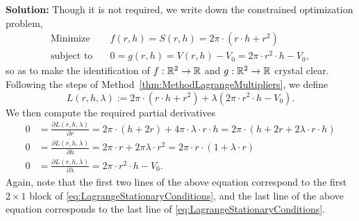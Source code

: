 \textbf{Solution:} Though it is not required, we write down the constrained optimization problem,
\begin{align*}
\text{Minimize} \quad & f(r,h)=S(r,h) = 2 \pi \cdot (r \cdot h + r^2)\\
\text{subject to} \quad & 0 = g(r,h) = V(r,h)-V_0 = 2 \pi \cdot r^2 \cdot h - V_0,
\end{align*}
so as to make the identification of $f:\mathbb R^2 \to \mathbb R$ and $g:\mathbb R^2 \to \mathbb R$ crystal clear. Following the steps of Method~\ref{thm:MethodLagrangeMultipliers}, we define
$$L(r,h, \lambda):=2 \pi \cdot (r \cdot h + r^2) + \lambda \left(  2 \pi \cdot r^2 \cdot h - V_0\right).$$
We then compute the required partial derivatives 
\begin{equation}
\label{eq:LagrangeStationaryConditionsExample2}
\begin{aligned}
0 &= \frac{ \partial L(r, h, \lambda)}{\partial r} =  2 \pi \cdot \left( h + 2  r \right) +4 \pi \cdot \lambda \cdot r \cdot h   =
2 \pi \cdot \left( h + 2  r  + 2 \lambda \cdot r \cdot h \right) \\
0 &= \frac{ \partial L(r, h, \lambda)}{\partial h} =  2 \pi \cdot r + 2  \pi \lambda \cdot  r^2 =
2 \pi \cdot r \cdot ( 1 + \lambda \cdot r)\\
0 &= \frac{ \partial L(r, h, \lambda)}{\partial \lambda} = 2 \pi \cdot r^2 \cdot h - V_0.    
\end{aligned}
\end{equation}
Again, note that the first two lines of the above equation correspond to the first $2 \times 1$ block of \eqref{eq:LagrangeStationaryConditions}, and the last line of the above equation corresponds to the last line of \eqref{eq:LagrangeStationaryConditions}. \\


